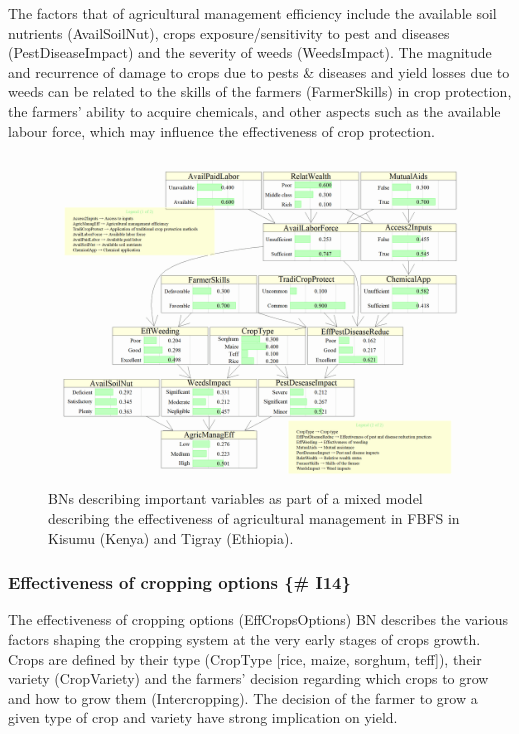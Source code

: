 \documentclass[12pt,oneside]{article}
\begin{document}
The factors that of agricultural management efficiency include the available soil nutrients (AvailSoilNut), crops exposure/sensitivity to pest and diseases (PestDiseaseImpact) and the severity of weeds (WeedsImpact). The magnitude and recurrence of damage to crops due to pests \& diseases and yield losses due to weeds can be related to the skills of the farmers (FarmerSkills) in crop protection, the farmers' ability to acquire chemicals, and other aspects such as the available labour force, which may influence the effectiveness of crop protection.

\begin{figure}[!htbp]

{\centering \includegraphics[width=1\linewidth,]{figures/Modelling_FBFS_Agricultural_management_efficiency_BNs_plot} 

}

\caption{BNs describing important variables as part of a mixed model describing the effectiveness of agricultural management in FBFS in Kisumu (Kenya) and Tigray (Ethiopia).}\label{fig:fig5}
\end{figure}

\hypertarget{effectiveness-of-cropping-options-i14}{%
\subsubsection{Effectiveness of cropping options \{\# I14\}}\label{effectiveness-of-cropping-options-i14}}

The effectiveness of cropping options (EffCropsOptions) BN describes the various factors shaping the cropping system at the very early stages of crops growth. Crops are defined by their type (CropType {[}rice, maize, sorghum, teff{]}), their variety (CropVariety) and the farmers' decision regarding which crops to grow and how to grow them (Intercropping). The decision of the farmer to grow a given type of crop and variety have strong implication on yield.
\end{document}
